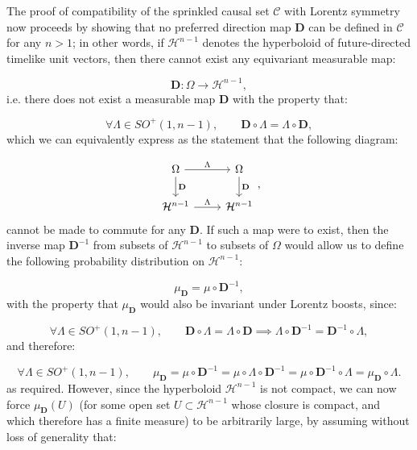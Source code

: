 \documentclass{article}
\begin{document}
The proof of compatibility of the sprinkled causal set ${\mathcal{C}}$ with Lorentz symmetry now proceeds by showing that no preferred direction map ${\mathbf{D}}$ can be defined in ${\mathcal{C}}$ for any ${n > 1}$; in other words, if ${\mathcal{H}^{n - 1}}$ denotes the hyperboloid of future-directed timelike unit vectors, then there cannot exist any equivariant measurable map:

\begin{equation}
\mathbf{D} : \Omega \to \mathcal{H}^{n - 1},
\end{equation}
i.e. there does not exist a measurable map ${\mathbf{D}}$ with the property that:

\begin{equation}
\forall \Lambda \in SO^{+} \left( 1, n - 1 \right), \qquad \mathbf{D} \circ \Lambda = \Lambda \circ \mathbf{D},
\end{equation}
which we can equivalently express as the statement that the following diagram:

\begin{equation}
\begin{tikzcd}
\Omega \arrow[r, "\Lambda"] \arrow[d, "\mathbf{D}"] & \Omega \arrow[d, "\mathbf{D}"]\\
\mathcal{H}^{n - 1} \arrow[r, "\Lambda"] & \mathcal{H}^{n - 1}
\end{tikzcd},
\end{equation}
cannot be made to commute for any ${\mathbf{D}}$. If such a map were to exist, then the inverse map ${\mathbf{D}^{-1}}$ from subsets of ${\mathcal{H}^{n - 1}}$ to subsets of ${\Omega}$ would allow us to define the following probability distribution on ${\mathcal{H}^{n -1}}$:

\begin{equation}
\mu_{\mathbf{D}} = \mu \circ \mathbf{D}^{-1},
\end{equation}
with the property that ${\mu_{\mathbf{D}}}$ would also be invariant under Lorentz boosts, since:

\begin{equation}
\forall \Lambda \in SO^{+} \left( 1, n - 1 \right), \qquad \mathbf{D} \circ \Lambda = \Lambda \circ \mathbf{D} \implies \Lambda \circ \mathbf{D}^{-1} = \mathbf{D}^{-1} \circ \Lambda,
\end{equation}
and therefore:

\begin{equation}
\forall \Lambda \in SO^{+} \left( 1, n - 1 \right), \qquad \mu_{\mathbf{D}} = \mu \circ \mathbf{D}^{-1} = \mu \circ \Lambda \circ \mathbf{D}^{-1} = \mu \circ \mathbf{D}^{-1} \circ \Lambda = \mu_{\mathbf{D}} \circ \Lambda.
\end{equation}
as required. However, since the hyperboloid ${\mathcal{H}^{n - 1}}$ is not compact, we can now force ${\mu_{\mathbf{D}} \left( U \right)}$ (for some open set ${U \subset \mathcal{H}^{n - 1}}$ whose closure is compact, and which therefore has a finite measure) to be arbitrarily large, by assuming without loss of generality that:
\end{document}
